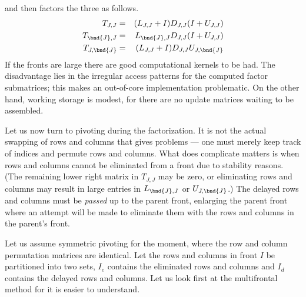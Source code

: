 and then factors the three as follows.
\begin{eqnarray*}
T_{J,J}       & = & (L_{J,J} + I)D_{J,J}(I + U_{J,J}) \\
T_{\bnd{J},J} & = & L_{\bnd{J},J}D_{J,J}(I + U_{J,J}) \\
T_{J,\bnd{J}} & = & (L_{J,J} + I)D_{J,J}U_{J,\bnd{J}}
\end{eqnarray*}
If the fronts are large there are good computational kernels to be had.
The disadvantage lies in the irregular access patterns for the
computed factor submatrices; this makes an out-of-core
implementation problematic.
On the other hand, working storage is modest, for there are no
update matrices waiting to be assembled.
\par \bigskip \par
{}
\par \bigskip \par
Let us now turn to pivoting during the factorization.
It is not the actual swapping of rows and columns that gives
problems --- one must merely keep track
of indices and permute rows and columns.
What does complicate matters is when rows and columns cannot be
eliminated from a front due to stability reasons.
(The remaining lower right matrix in $T_{J,J}$ may be zero, or
eliminating rows and columns may result in large entries in
$L_{\bnd{J},J}$ or $U_{J,\bnd{J}}$.)
The delayed rows and columns must be {\it passed} up to the parent
front, enlarging the parent front where an attempt will be made
to eliminate them with the rows and columns in the parent's front.
\par
Let us assume symmetric pivoting for the moment, where the row and
column permutation matrices are identical.
Let the rows and columns in front $I$ be partitioned into two sets,
$I_e$ contains the eliminated rows and columns
and
$I_d$ contains the delayed rows and columns.
Let us look first at the multifrontal method for it is easier to
understand.
